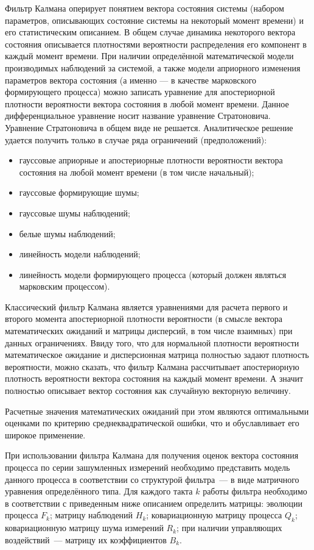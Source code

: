 Фильтр Калмана оперирует понятием вектора состояния системы (набором параметров, описывающих состояние системы на некоторый момент времени) и его статистическим описанием. В общем случае динамика некоторого вектора состояния описывается плотностями вероятности распределения его компонент в каждый момент времени. При наличии определённой математической модели производимых наблюдений за системой, а также модели априорного изменения параметров вектора состояния (а именно --- в качестве марковского формирующего процесса) можно записать уравнение для апостериорной плотности вероятности вектора состояния в любой момент времени. Данное дифференциальное уравнение носит название уравнение Стратоновича. Уравнение Стратоновича в общем виде не решается. Аналитическое решение удается получить только в случае ряда ограничений (предположений):
\begin{itemize}
	\item гауссовые априорные и апостериорные плотности вероятности вектора состояния на любой момент времени (в том числе начальный);
	\item гауссовые формирующие шумы;
	\item гауссовые шумы наблюдений;
	\item белые шумы наблюдений;
	\item линейность модели наблюдений;
	\item линейность модели формирующего процесса (который должен являться марковским процессом).
\end{itemize}

Классический фильтр Калмана является уравнениями для расчета первого и второго момента апостериорной плотности вероятности (в смысле вектора математических ожиданий и матрицы дисперсий, в том числе взаимных) при данных ограничениях. Ввиду того, что для нормальной плотности вероятности математическое ожидание и дисперсионная матрица полностью задают плотность вероятности, можно сказать, что фильтр Калмана рассчитывает апостериорную плотность вероятности вектора состояния на каждый момент времени. А значит полностью описывает вектор состояния как случайную векторную величину.

Расчетные значения математических ожиданий при этом являются оптимальными оценками по критерию среднеквадратической ошибки, что и обуславливает его широкое применение.

При использовании фильтра Калмана для получения оценок вектора состояния процесса по серии зашумленных измерений необходимо представить модель данного процесса в соответствии со структурой фильтра --- в виде матричного уравнения определённого типа. Для каждого такта $k$ работы фильтра необходимо в соответствии с приведенным ниже описанием определить матрицы: эволюции процесса $F_k$; матрицу наблюдений $H_k$; ковариационную матрицу процесса $Q_k$; ковариационную матрицу шума измерений $R_k$; при наличии управляющих воздействий --- матрицу их коэффициентов $B_k$. \cite{calman2}

